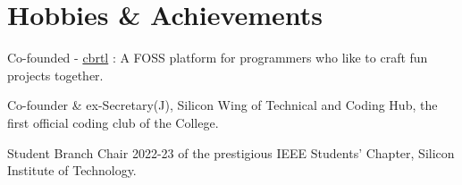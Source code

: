 \documentclass[]{assets/deedy-resume-openfont}
\begin{document}
\sectionsep
%
%
\section{Hobbies \& Achievements}
\begin{tightemize}  
\item Co-founded - \href{https://cbrtl.github.io}{cbrtl} : A FOSS platform for programmers who like to craft fun projects together.\\
\item Co-founder \& ex-Secretary(J), Silicon Wing of Technical and Coding Hub, the first official coding club of the College.\\
\item Student Branch Chair 2022-23 of the prestigious IEEE Students’ Chapter, Silicon Institute of Technology.\\
\end{tightemize}
\ 
\end{document}
